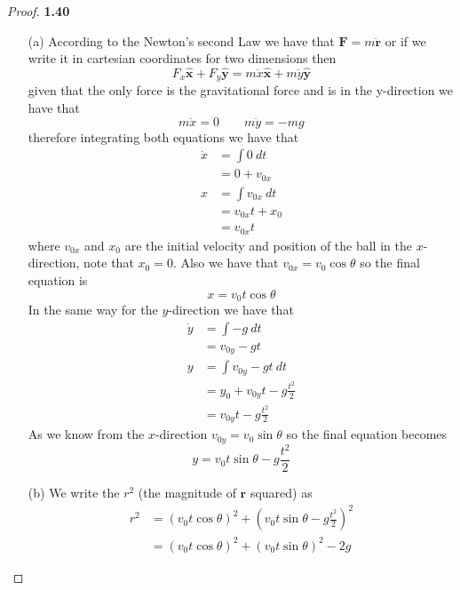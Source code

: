 \documentclass[11pt]{article}
\newcommand{\hatx}{\bm{\hat{x}}}
\newcommand{\haty}{\bm{\hat{y}}}
\begin{document}
        \begin{proof}{\textbf{1.40}}
            \begin{itemize}
            \item [(a)] According to the Newton's second Law we have that
            $\bm{F} = m\bm{\ddot{r}}$ or if we write it in cartesian coordinates
            for two dimensions then 
            $$F_x\hatx + F_y \haty = m\ddot{x} \hatx + m\ddot{y} \haty$$
            given that the only force is the gravitational force and is in the
            y-direction we have that
            $$m\ddot{x} = 0\quad \quad m\ddot{y} = -mg$$
            therefore integrating both equations we have that
            \begin{align*}
                \dot{x} &= \int{0~dt} \\
                        &= 0 + v_{0x} \\
                      x &= \int{v_{0x}~dt} \\
                        &= v_{0x}t + x_0 \\
                        &= v_{0x}t
            \end{align*}
            where $v_{0x}$ and $x_0$ are the initial velocity and position of
            the ball in the $x$-direction, note that $x_0 = 0$.
            Also we have that $v_{0x} = v_0 \cos{\theta}$ so the final equation
            is $$x = v_0 t \cos{\theta}$$ 
            In the same way for the $y$-direction we have that
            \begin{align*}
                \dot{y} &= \int{-g~dt} \\
                        &= v_{0y} - gt \\
                      y &= \int{v_{0y} - gt~dt} \\
                        &= y_0 + v_{0y}t - g \frac{t^2}{2}\\
                        &= v_{0y}t - g \frac{t^2}{2}
            \end{align*}
            As we know from the $x$-direction $v_{0y} = v_0 \sin{\theta}$ so the final equation
            becomes $$y = v_{0}t\sin{\theta} - g \frac{t^2}{2}$$
            \item [(b)] We write the $r^2$ (the magnitude of $\bm{r}$ squared)
            as
            \begin{align*}
                r^2 &= (v_0 t\cos{\theta})^2 + \left(v_0 t\sin{\theta} - g \frac{t^2}{2}\right)^2 \\
                    &= (v_0 t\cos{\theta})^2 + (v_0 t\sin{\theta})^2 - 2 g

\end{align*}
\end{itemize}
\end{proof}
\end{document}

